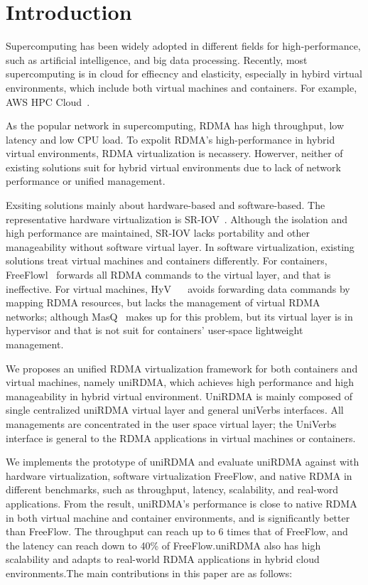 \section{Introduction}
 Supercomputing has been widely adopted in different fields for high-performance, such as artificial intelligence, and big data processing. Recently, most supercomputing is in cloud for effiecncy and elasticity, especially in hybird virtual environments, which include both virtual machines and containers. For example, AWS HPC Cloud~\cite{aws-hpc}.

As the popular network in supercomputing, RDMA has high throughput, low latency and low CPU load. To expolit RDMA's high-performance in hybrid virtual environments, RDMA virtualization is necassery. Howerver, neither of existing solutions suit for hybrid virtual environments due to lack of network performance or unified management.

Exsiting solutions mainly about hardware-based and software-based. The representative hardware virtualization is SR-IOV~\cite{sr-iov}.  Although the isolation and high performance are maintained,  SR-IOV lacks portability and other manageability without software virtual layer. In software virtualization, existing solutions treat virtual machines and containers differently. For containers, FreeFlowl~\cite{kim2019freeflow} forwards all RDMA commands to the virtual layer, and that is ineffective. For virtual machines, HyV~\cite{pfefferle2015hybrid} ~\cite{pfefferle2014vverbs} avoids forwarding data commands by mapping RDMA resources, but lacks the management of virtual RDMA networks; although MasQ~\cite{he2020masq} makes up for this problem, but its virtual layer is in hypervisor and that is not suit for containers' user-space lightweight  management.

We proposes an unified RDMA virtualization framework for both containers and virtual machines, namely uniRDMA, which achieves high performance and high manageability in hybrid virtual environment. UniRDMA is mainly composed of single centralized uniRDMA virtual layer and general uniVerbs interfaces. All managements are concentrated in the user space virtual layer; the UniVerbs interface is general to the RDMA applications in virtual machines or containers.

We implements the prototype of uniRDMA and evaluate uniRDMA against with hardware virtualization, software virtualization FreeFlow, and native RDMA in different benchmarks, such as throughput, latency, scalability, and real-word applications. From the result, uniRDMA's performance is close to native RDMA in both virtual machine and container environments, and is significantly better than FreeFlow. The throughput can reach up to 6 times that of FreeFlow, and the latency can reach down to 40\% of FreeFlow.uniRDMA also has high scalability and adapts to real-world RDMA applications in hybrid cloud environments.The main contributions in this paper are as follows:


